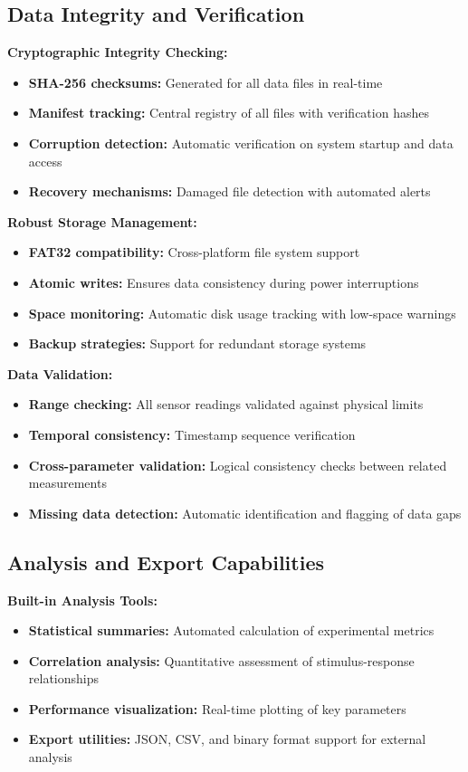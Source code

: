 \documentclass[11pt,a4paper]{article}
\begin{document}
\subsection{Data Integrity and Verification}

\textbf{Cryptographic Integrity Checking:}
\begin{itemize}
\item \textbf{SHA-256 checksums:} Generated for all data files in real-time
\item \textbf{Manifest tracking:} Central registry of all files with verification hashes
\item \textbf{Corruption detection:} Automatic verification on system startup and data access
\item \textbf{Recovery mechanisms:} Damaged file detection with automated alerts
\end{itemize}

\textbf{Robust Storage Management:}
\begin{itemize}
\item \textbf{FAT32 compatibility:} Cross-platform file system support
\item \textbf{Atomic writes:} Ensures data consistency during power interruptions
\item \textbf{Space monitoring:} Automatic disk usage tracking with low-space warnings
\item \textbf{Backup strategies:} Support for redundant storage systems
\end{itemize}

\textbf{Data Validation:}
\begin{itemize}
\item \textbf{Range checking:} All sensor readings validated against physical limits
\item \textbf{Temporal consistency:} Timestamp sequence verification
\item \textbf{Cross-parameter validation:} Logical consistency checks between related measurements
\item \textbf{Missing data detection:} Automatic identification and flagging of data gaps
\end{itemize}

\subsection{Analysis and Export Capabilities}

\textbf{Built-in Analysis Tools:}
\begin{itemize}
\item \textbf{Statistical summaries:} Automated calculation of experimental metrics
\item \textbf{Correlation analysis:} Quantitative assessment of stimulus-response relationships
\item \textbf{Performance visualization:} Real-time plotting of key parameters
\item \textbf{Export utilities:} JSON, CSV, and binary format support for external analysis
\end{itemize}
\end{document}
